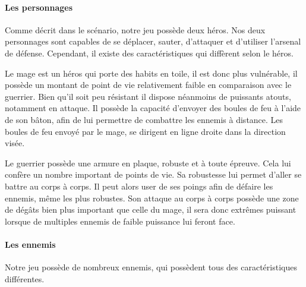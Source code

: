\documentclass[a4paper, 12pt]{article}
\begin{document}
			\paragraph{Les personnages}
			Comme décrit dans le scénario, notre jeu possède deux héros. Nos deux personnages sont capables de se déplacer, sauter, d’attaquer et d’utiliser l’arsenal de défense. Cependant, il existe des caractéristiques qui diffèrent selon le héros.
\par Le mage est un héros qui porte des habits en toile, il est donc plus vulnérable, il possède un montant de point de vie relativement faible en comparaison avec le guerrier. Bien qu’il soit peu résistant il dispose néanmoins de puissants atouts, notamment en attaque. 
Il possède la capacité d’envoyer des boules de feu à l’aide de son bâton, afin de lui permettre de combattre les ennemis à distance. Les boules de feu envoyé par le mage, se dirigent en ligne droite dans la direction visée.
\par Le guerrier possède une armure en plaque, robuste et à toute épreuve. Cela lui confère un nombre important de points de vie. Sa robustesse lui permet d’aller se battre au corps à corps. Il peut alors user de ses poings afin de défaire les ennemis, même les plus robustes. Son attaque au corps à corps possède une zone de dégâts bien plus important que celle du mage, il sera donc extrêmes puissant lorsque de multiples ennemis de faible puissance lui feront face.
			\paragraph{Les ennemis}
			Notre jeu possède de nombreux ennemis, qui possèdent tous des caractéristiques différentes.\\
			
\end{document}
